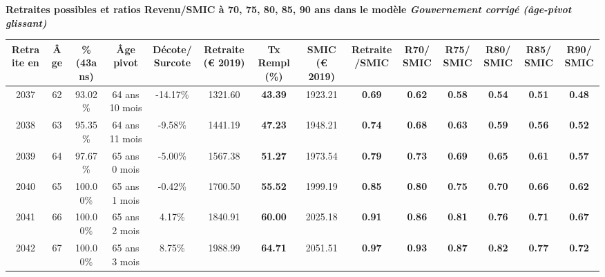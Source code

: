  \vspace{0.1cm} 
{\bf \noindent Retraites possibles et ratios Revenu/SMIC à 70, 75, 80, 85, 90 ans dans le modèle \emph{Gouvernement corrigé (âge-pivot glissant)}}  
 
\begin{adjustbox}{max width=\textwidth} 
\begin{tabular}[htb]{|c|c||c|c|c||c|c||c|c||c|c|c|c|c|} 
\hline 
 Retraite en &  Âge &  \%(43ans) &  Âge pivot &  Décote/Surcote &  Retraite (\euro{} 2019) &  Tx Rempl(\%) &  SMIC (\euro{} 2019) &  Retraite/SMIC &  R70/SMIC &  R75/SMIC &  R80/SMIC &  R85/SMIC &  R90/SMIC \\ 
\hline \hline 
 2037 &  62 &  93.02\% &  64 ans 10 mois &  -14.17\% &  1321.60 &  {\bf 43.39} &  1923.21 &  {\bf {\color{red} 0.69}} &  {\bf {\color{red} 0.62}} &  {\bf {\color{red} 0.58}} &  {\bf {\color{red} 0.54}} &  {\bf {\color{red} 0.51}} &  {\bf {\color{red} 0.48}} \\ 
\hline 
 2038 &  63 &  95.35\% &  64 ans 11 mois &  -9.58\% &  1441.19 &  {\bf 47.23} &  1948.21 &  {\bf {\color{red} 0.74}} &  {\bf {\color{red} 0.68}} &  {\bf {\color{red} 0.63}} &  {\bf {\color{red} 0.59}} &  {\bf {\color{red} 0.56}} &  {\bf {\color{red} 0.52}} \\ 
\hline 
 2039 &  64 &  97.67\% &  65 ans 0 mois &  -5.00\% &  1567.38 &  {\bf 51.27} &  1973.54 &  {\bf {\color{red} 0.79}} &  {\bf {\color{red} 0.73}} &  {\bf {\color{red} 0.69}} &  {\bf {\color{red} 0.65}} &  {\bf {\color{red} 0.61}} &  {\bf {\color{red} 0.57}} \\ 
\hline 
 2040 &  65 &  100.00\% &  65 ans 1 mois &  -0.42\% &  1700.50 &  {\bf 55.52} &  1999.19 &  {\bf {\color{red} 0.85}} &  {\bf {\color{red} 0.80}} &  {\bf {\color{red} 0.75}} &  {\bf {\color{red} 0.70}} &  {\bf {\color{red} 0.66}} &  {\bf {\color{red} 0.62}} \\ 
\hline 
 2041 &  66 &  100.00\% &  65 ans 2 mois &  4.17\% &  1840.91 &  {\bf 60.00} &  2025.18 &  {\bf {\color{red} 0.91}} &  {\bf {\color{red} 0.86}} &  {\bf {\color{red} 0.81}} &  {\bf {\color{red} 0.76}} &  {\bf {\color{red} 0.71}} &  {\bf {\color{red} 0.67}} \\ 
\hline 
 2042 &  67 &  100.00\% &  65 ans 3 mois &  8.75\% &  1988.99 &  {\bf 64.71} &  2051.51 &  {\bf {\color{red} 0.97}} &  {\bf {\color{red} 0.93}} &  {\bf {\color{red} 0.87}} &  {\bf {\color{red} 0.82}} &  {\bf {\color{red} 0.77}} &  {\bf {\color{red} 0.72}} \\ 
\hline 
\hline 
\end{tabular} 
\end{adjustbox} 
 
